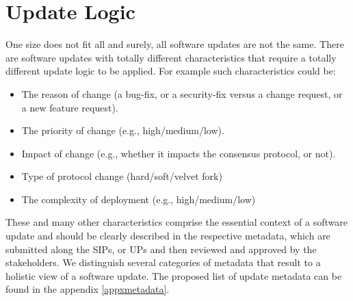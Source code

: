 \section{Update Logic}
One size does not fit all and surely, all software updates are not the same. There are software updates with totally different characteristics that require a totally different update logic to be applied. For example such characteristics could be:
\begin{itemize}
\item The reason of change (a bug-fix, or a security-fix versus a change request, or a new feature request).
\item The priority of change (e.g., high/medium/low).
\item Impact of change (e.g., whether it impacts the consensus protocol, or not).
\item Type of protocol change (hard/soft/velvet fork)
\item The complexity of deployment (e.g., high/medium/low)
\end{itemize}
These and many other characteristics comprise the essential context of a software update and should be clearly described in the respective metadata, which are submitted along the SIPs, or UPs and then reviewed and approved by the stakeholders. We distinguish several categories of metadata that result to a holistic view of a software update. The proposed list of update metadata can be found in the appendix \ref{appxmetadata}. 

